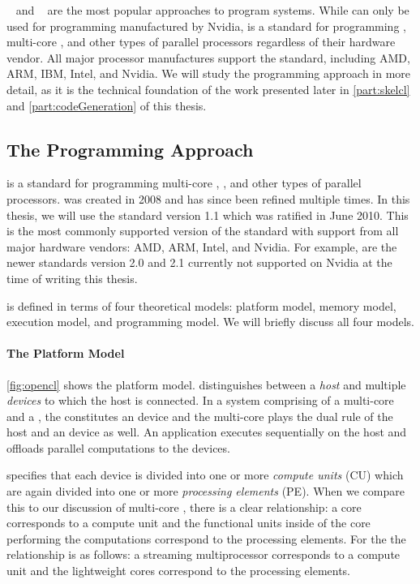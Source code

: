 \CUDA~\cite{CUDAProgrammingGuide} and \OpenCL~\cite{OpenCL} are the most popular approaches to program \GPU systems.
While \CUDA can only be used for programming \GPUs manufactured by Nvidia, \OpenCL is a standard for programming \GPUs, multi-core \CPUs, and other types of parallel processors regardless of their hardware vendor.
All major processor manufactures support the \OpenCL standard, including AMD, ARM, IBM, Intel, and Nvidia.
We will study the \OpenCL programming approach in more detail, as it is the technical foundation of the work presented later in \autoref{part:skelcl} and \autoref{part:codeGeneration} of this thesis.


\subsection{The \OpenCL Programming Approach}
\OpenCL is a standard for programming multi-core \CPUs, \GPUs, and other types of parallel processors.
\OpenCL was created in 2008 and has since been refined multiple times.
In this thesis, we will use the \OpenCL standard version 1.1 which was ratified in June 2010.
This is the most commonly supported version of the standard with support from all major hardware vendors: AMD, ARM, Intel, and Nvidia.
For example, are the newer \OpenCL standards version 2.0 and 2.1 currently not supported on Nvidia \GPUs at the time of writing this thesis.

\OpenCL is defined in terms of four theoretical models: platform model, memory model, execution model, and programming model.
We will briefly discuss all four models.

\paragraph{The \OpenCL Platform Model}
\autoref{fig:opencl} shows the \OpenCL platform model.
\OpenCL distinguishes between a \emph{host} and multiple \OpenCL \emph{devices} to which the host is connected.
In a system comprising of a multi-core \CPU and a \GPU, the \GPU constitutes an \OpenCL device and the multi-core \CPU plays the dual rule of the host and an \OpenCL device as well.
An \OpenCL application executes sequentially on the host and offloads parallel computations to the \OpenCL devices.

\OpenCL specifies that each device is divided into one or more \emph{compute units} (CU) which are again divided into one or more \emph{processing elements} (PE).
When we compare this to our discussion of multi-core \CPUs, there is a clear relationship:
a \CPU core corresponds to a compute unit and the functional units inside of the \CPU core performing the computations correspond to the processing elements.
For the \GPU the relationship is as follows:
a streaming multiprocessor corresponds to a compute unit and the lightweight \GPU cores correspond to the processing elements.

